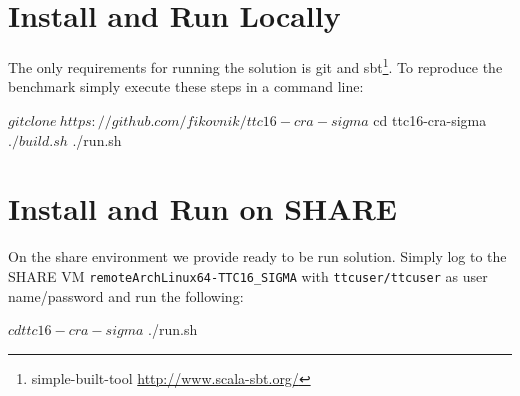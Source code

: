 
\section{Install and Run Locally}
\label{sec:InstallLocally}

The only requirements for running the solution is git and sbt\footnote{simple-built-tool \Cf \url{http://www.scala-sbt.org/}}.
To reproduce the benchmark simply execute these steps in a command line:

\begin{bashcode}
$ git clone \
  https://github.com/fikovnik/ttc16-cra-sigma
$ cd ttc16-cra-sigma
$ ./build.sh
$ ./run.sh
\end{bashcode}

\section{Install and Run on SHARE}
\label{sec:InstallSHARE}

On the share environment we provide ready to be run solution. Simply log to the SHARE VM \texttt{remoteArchLinux64-TTC16\_SIGMA} with \texttt{ttcuser/ttcuser} as user name/password and run the following:

\begin{bashcode}
$ cd ttc16-cra-sigma
$ ./run.sh
\end{bashcode}